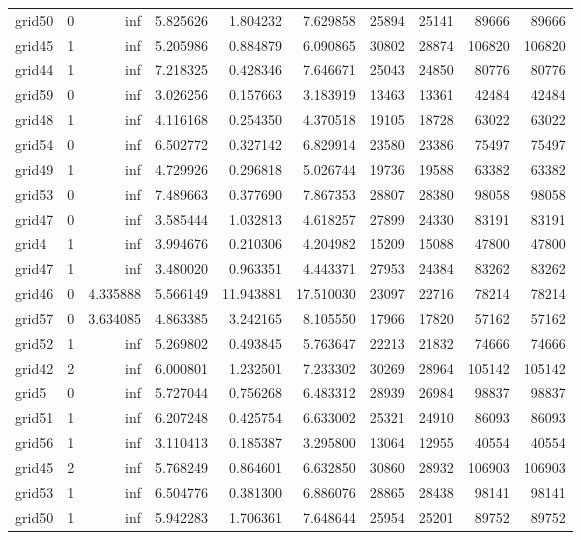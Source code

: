 \begin{longtable}{|l|r|r|r|r|r|r|r|r|r|}
grid50 & 0 & inf & 5.825626 & 1.804232 & 7.629858 & 25894 & 25141 & 89666 & 89666 \\
grid45 & 1 & inf & 5.205986 & 0.884879 & 6.090865 & 30802 & 28874 & 106820 & 106820 \\
grid44 & 1 & inf & 7.218325 & 0.428346 & 7.646671 & 25043 & 24850 & 80776 & 80776 \\
grid59 & 0 & inf & 3.026256 & 0.157663 & 3.183919 & 13463 & 13361 & 42484 & 42484 \\
grid48 & 1 & inf & 4.116168 & 0.254350 & 4.370518 & 19105 & 18728 & 63022 & 63022 \\
grid54 & 0 & inf & 6.502772 & 0.327142 & 6.829914 & 23580 & 23386 & 75497 & 75497 \\
grid49 & 1 & inf & 4.729926 & 0.296818 & 5.026744 & 19736 & 19588 & 63382 & 63382 \\
grid53 & 0 & inf & 7.489663 & 0.377690 & 7.867353 & 28807 & 28380 & 98058 & 98058 \\
grid47 & 0 & inf & 3.585444 & 1.032813 & 4.618257 & 27899 & 24330 & 83191 & 83191 \\
grid4 & 1 & inf & 3.994676 & 0.210306 & 4.204982 & 15209 & 15088 & 47800 & 47800 \\
grid47 & 1 & inf & 3.480020 & 0.963351 & 4.443371 & 27953 & 24384 & 83262 & 83262 \\
grid46 & 0 & 4.335888 & 5.566149 & 11.943881 & 17.510030 & 23097 & 22716 & 78214 & 78214 \\
grid57 & 0 & 3.634085 & 4.863385 & 3.242165 & 8.105550 & 17966 & 17820 & 57162 & 57162 \\
grid52 & 1 & inf & 5.269802 & 0.493845 & 5.763647 & 22213 & 21832 & 74666 & 74666 \\
grid42 & 2 & inf & 6.000801 & 1.232501 & 7.233302 & 30269 & 28964 & 105142 & 105142 \\
grid5 & 0 & inf & 5.727044 & 0.756268 & 6.483312 & 28939 & 26984 & 98837 & 98837 \\
grid51 & 1 & inf & 6.207248 & 0.425754 & 6.633002 & 25321 & 24910 & 86093 & 86093 \\
grid56 & 1 & inf & 3.110413 & 0.185387 & 3.295800 & 13064 & 12955 & 40554 & 40554 \\
grid45 & 2 & inf & 5.768249 & 0.864601 & 6.632850 & 30860 & 28932 & 106903 & 106903 \\
grid53 & 1 & inf & 6.504776 & 0.381300 & 6.886076 & 28865 & 28438 & 98141 & 98141 \\
grid50 & 1 & inf & 5.942283 & 1.706361 & 7.648644 & 25954 & 25201 & 89752 & 89752 \\

\end{longtable}
